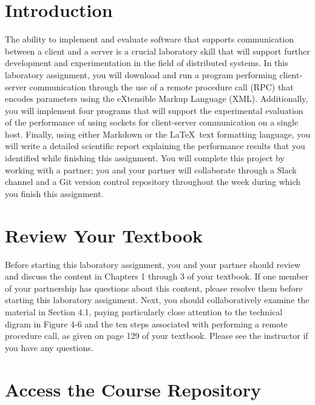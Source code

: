 

\usepackage[compact]{titlesec}



\section*{Introduction}

The ability to implement and evaluate software that supports communication between a client and a server is a crucial
laboratory skill that will support further development and experimentation in the field of distributed systems. In this
laboratory assignment, you will download and run a program performing client-server communication through the use of a
remote procedure call (RPC) that encodes parameters using the eXtensible Markup Language (XML). Additionally, you will
implement four programs that will support the experimental evaluation of the performance of using sockets for
client-server communication on a single host. Finally, using either Markdown or the \LaTeX~text formatting language, you
will write a detailed scientific report explaining the performance results that you identified while finishing this
assignment. You will complete this project by working with a partner; you and your partner will collaborate through a
Slack channel and a Git version control repository throughout the week during which you finish this assignment.

\section*{Review Your Textbook}

Before starting this laboratory assignment, you and your partner should review and discuss the content in Chapters 1
through 3 of your textbook. If one member of your partnership has questions about this content, please resolve them
before starting this laboratory assignment. Next, you should collaboratively examine the material in Section 4.1, paying
particularly close attention to the technical digram in Figure 4-6 and the ten steps associated with performing a remote
procedure call, as given on page 129 of your textbook. Please see the instructor if you have any questions.

\section*{Access the Course Repository}


